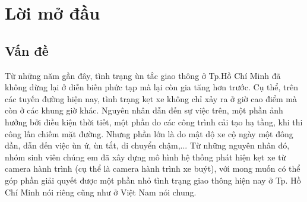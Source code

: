 \chapter*{Lời mở đầu}

\section*{Vấn đề}
	 Từ những năm gần đây, tình trạng ùn tắc giao thông ở Tp.Hồ Chí Minh đã không dừng lại ở diễn biến phức tạp mà lại còn gia tăng hơn trước. Cụ thể, trên các tuyến đường hiện nay, tình trạng kẹt xe không chỉ xảy ra ở giờ cao điểm mà còn ở các khung giờ khác. Nguyên nhân dẫn đến sự việc trên, một phần ảnh hưởng bởi điều kiện thời tiết, một phần do các công trình cải tạo hạ tầng, khi thi công lấn chiếm mặt đường. Nhưng phần lớn là do mật dộ xe cộ ngày một đông dần, dẫn đến việc ùn ứ, ùn tắt, di chuyển chậm,... Từ những nguyên nhân đó, nhóm sinh viên chúng em đã xây dựng mô hình hệ thống phát hiện kẹt xe từ camera hành trình (cụ thể là camera hành trình xe buýt), với mong muốn có thể góp phần giải quyết được một phần nhỏ tình trạng giao thông hiện nay ở Tp. Hồ Chí Minh nói riêng cũng như ở Việt Nam nói chung.\par
